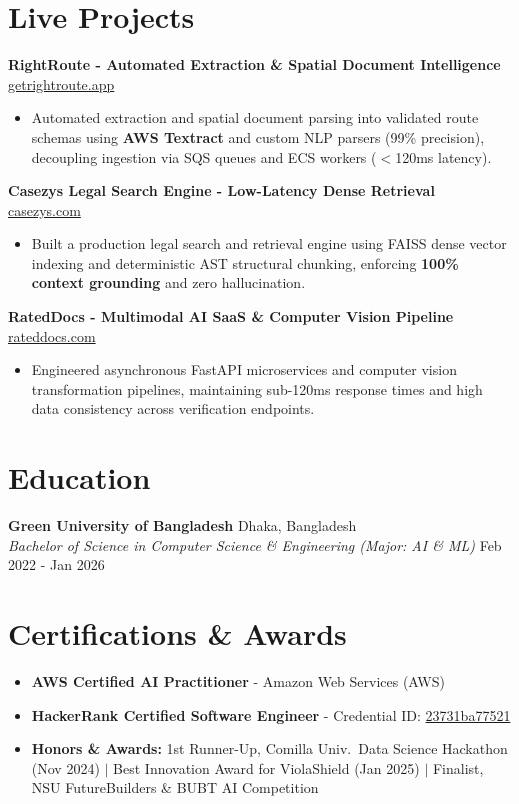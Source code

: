 \documentclass[9.5pt,a4paper]{article}
\begin{document}
\section*{Live Projects}
\noindent
\textbf{RightRoute - Automated Extraction \& Spatial Document Intelligence} \hfill \href{https://getrightroute.app}{getrightroute.app}
\begin{itemize}
    \item Automated extraction and spatial document parsing into validated route schemas using \textbf{AWS Textract} and custom NLP parsers (99\% precision), decoupling ingestion via SQS queues and ECS workers ($<$120ms latency).
\end{itemize}
\vspace{0.6pt}
\noindent
\textbf{Casezys Legal Search Engine - Low-Latency Dense Retrieval} \hfill \href{https://casezys.com}{casezys.com}
\begin{itemize}
    \item Built a production legal search and retrieval engine using FAISS dense vector indexing and deterministic AST structural chunking, enforcing \textbf{100\% context grounding} and zero hallucination.
\end{itemize}
\vspace{0.6pt}
\noindent
\textbf{RatedDocs - Multimodal AI SaaS \& Computer Vision Pipeline} \hfill \href{https://rateddocs.com}{rateddocs.com}
\begin{itemize}
    \item Engineered asynchronous FastAPI microservices and computer vision transformation pipelines, maintaining sub-120ms response times and high data consistency across verification endpoints.
\end{itemize}
\vspace{0.6pt}

\section*{Education}
\noindent
\textbf{Green University of Bangladesh} \hfill Dhaka, Bangladesh\\
\textit{Bachelor of Science in Computer Science \& Engineering (Major: AI \& ML)} \hfill Feb 2022 - Jan 2026

\section*{Certifications \& Awards}
\begin{itemize}
    \item \textbf{AWS Certified AI Practitioner} - Amazon Web Services (AWS)
    \item \textbf{HackerRank Certified Software Engineer} - Credential ID: \href{https://www.hackerrank.com/certificates/23731ba77521}{23731ba77521}
    \item \textbf{Honors \& Awards:} 1st Runner-Up, Comilla Univ.\ Data Science Hackathon (Nov 2024) $\vert$ Best Innovation Award for ViolaShield (Jan 2025) $\vert$ Finalist, NSU FutureBuilders \& BUBT AI Competition
\end{itemize}
\end{document}
